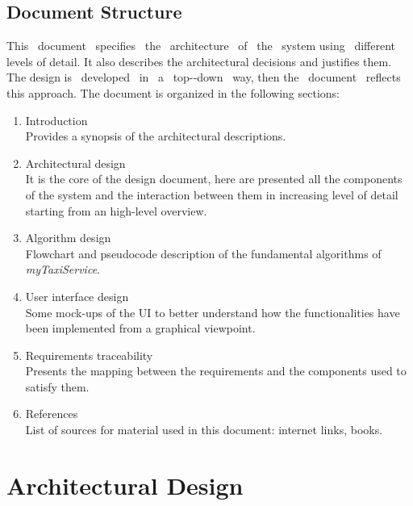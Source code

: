 \documentclass[a4paper,11pt]{report} %
\newcommand{\mts}{\mbox{\normalfont\itshape myTaxiService}}
\begin{document}
	\subsection{Document Structure} This  document  specifies  the  architecture  of  the  system  using  different levels of detail. It also describes the architectural decisions and justifies them. The design is  developed  in  a  top-­‐down  way, then the  document  reflects this approach.
	The document is organized in the following sections:
	\begin{enumerate}
		\item Introduction\\
		Provides a synopsis of the architectural descriptions.
		\item Architectural design\\
		It is the core of the design document, here are presented all the components of the system and the interaction between them in increasing level of detail starting from an high-level overview.		
		\item Algorithm design\\
		Flowchart and pseudocode description of the fundamental algorithms of \mts{}. 
		\item User interface design\\
		Some mock-ups of the UI to better understand how the functionalities have been implemented from a graphical viewpoint.
		\item Requirements traceability\\
		Presents the mapping between the requirements and the components used to satisfy them.
		\item References\\
		List of sources for material used in this document: internet links, books.
		
	\end{enumerate} 
	
	\section{Architectural Design}
	
\end{document}
